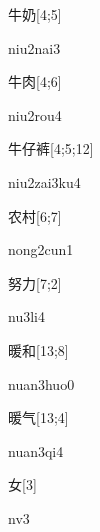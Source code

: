 \begin{verbete}{牛奶}[4;5]
\begin{pronuncia}{niu2nai3}
\end{pronuncia}
\end{verbete}

\begin{verbete}{牛肉}[4;6]
\begin{pronuncia}{niu2rou4}
\end{pronuncia}
\end{verbete}

\begin{verbete}{牛仔裤}[4;5;12]
\begin{pronuncia}{niu2zai3ku4}
\end{pronuncia}
\end{verbete}

\begin{verbete}{农村}[6;7]
\begin{pronuncia}{nong2cun1}
\end{pronuncia}
\end{verbete}

\begin{verbete}[nu3li4]{努力}[7;2]
\begin{pronuncia}{nu3li4}
\end{pronuncia}
\end{verbete}

\begin{verbete}{暖和}[13;8]
\begin{pronuncia}{nuan3huo0}
\end{pronuncia}
\end{verbete}

\begin{verbete}[nuan3qi4]{暖气}[13;4]
\begin{pronuncia}{nuan3qi4}
\end{pronuncia}
\end{verbete}

\begin{verbete}[nv3]{女}[3]
\begin{pronuncia}{nv3}
\end{pronuncia}
\end{verbete}

